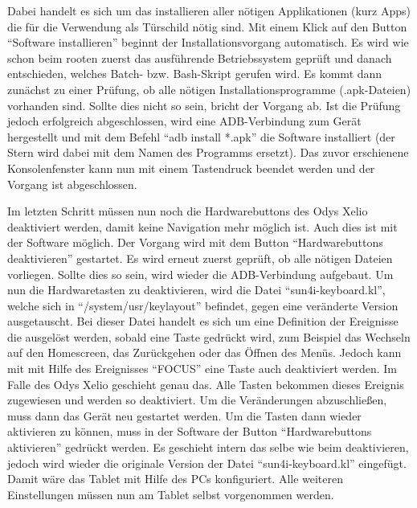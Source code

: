 \begin{flushleft}
Dabei handelt es sich um das installieren aller nötigen Applikationen (kurz Apps) die für die Verwendung als Türschild nötig sind. Mit einem Klick auf den Button ``Software installieren'' beginnt der Installationsvorgang automatisch. Es wird wie schon beim rooten zuerst das ausführende Betriebssystem geprüft und danach entschieden, welches Batch- bzw. Bash-Skript gerufen wird. Es kommt dann zunächst zu einer Prüfung, ob alle nötigen Installationsprogramme (.apk-Dateien) vorhanden sind. Sollte dies nicht so sein, bricht der Vorgang ab. Ist die Prüfung jedoch erfolgreich abgeschlossen, wird eine ADB-Verbindung zum Gerät hergestellt und mit dem Befehl ``adb install *.apk'' die Software installiert (der Stern wird dabei mit dem Namen des Programms ersetzt). Das zuvor erschienene Konsolenfenster kann nun mit einem Tastendruck beendet werden und der Vorgang ist abgeschlossen. 

Im letzten Schritt müssen nun noch die Hardwarebuttons des Odys Xelio deaktiviert werden, damit keine Navigation mehr möglich ist. Auch dies ist mit der Software möglich. Der Vorgang wird mit dem Button ``Hardwarebuttons deaktivieren'' gestartet. Es wird erneut zuerst geprüft, ob alle nötigen Dateien vorliegen. Sollte dies so sein, wird wieder die ADB-Verbindung aufgebaut. Um nun die Hardwaretasten zu deaktivieren, wird die Datei ``sun4i-keyboard.kl'', welche sich in ``/system/usr/keylayout'' befindet, gegen eine veränderte Version ausgetauscht. Bei dieser Datei handelt es sich um eine Definition der Ereignisse die ausgelöst werden, sobald eine Taste gedrückt wird, zum Beispiel das Wechseln auf den Homescreen, das Zurückgehen oder das Öffnen des Menüs. Jedoch kann mit mit Hilfe des Ereignisses ``FOCUS'' eine Taste auch deaktiviert werden. Im Falle des Odys Xelio geschieht genau das. Alle Tasten bekommen dieses Ereignis zugewiesen und werden so deaktiviert. Um die Veränderungen abzuschließen, muss dann das Gerät neu gestartet werden. Um die Tasten dann wieder aktivieren zu können, muss in der Software der Button ``Hardwarebuttons aktivieren'' gedrückt werden. Es geschieht intern das selbe wie beim deaktivieren, jedoch wird wieder die originale Version der Datei ``sun4i-keyboard.kl'' eingefügt. 
Damit wäre das Tablet mit Hilfe des PCs konfiguriert. Alle weiteren Einstellungen müssen nun am Tablet selbst vorgenommen werden.


\end{flushleft}
